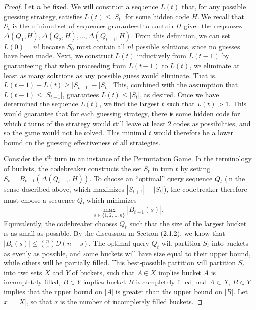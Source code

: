 \documentclass[12pt, a4paper]{article}
\newcommand{\nth}{^{\text{th}}}       %
\begin{document}
	\begin{proof}
		 Let $n$ be fixed. We will construct a sequence $L(t)$ that, for any possible guessing strategy, satisfies $L(t) \leq |S_t|$ for some hidden code $H$. We recall that $S_t$ is the minimal set of sequences guaranteed to contain $H$ given the responses $\Delta(Q_1, H), \Delta(Q_2, H), \ldots, \Delta(Q_{t-1}, H)$. From this definition, we can set $L(0) = n!$ because $S_0$ must contain all $n!$ possible solutions, since no guesses have been made. Next, we construct $L(t)$ inductively from $L(t-1)$ by guaranteeing that when proceeding from $L(t-1)$ to $L(t)$, we eliminate at least as many solutions as any possible guess would eliminate. That is, $L(t-1)-L(t) \geq |S_{t-1}| - |S_{t}|$. This, combined with the assumption that $L(t-1) \le |S_{t-1}|$, guarantees $L(t) \leq |S_t|$, as desired. Once we have determined the sequence $L(t)$, we find the largest $t$ such that $L(t) > 1$. This would guarantee that for each guessing strategy, there is some hidden code for which $t$ turns of the strategy would still leave at least 2 codes as possibilities, and so the game would not be solved. This minimal $t$ would therefore be a lower bound on the guessing effectiveness of all strategies. 
		 
		 Consider the $t\nth$ turn in an instance of the Permutation Game. In the terminology of buckets, the codebreaker constructs the set $S_t$ in turn $t$ by setting $S_t = B_{t-1}(\Delta(Q_{t-1}, H))$. To choose an ``optimal'' query sequence $Q_t$ (in the sense described above, which maximizes $|S_{t+1}| - |S_{t}|$), the codebreaker therefore must choose a sequence $Q_t$ which minimizes
		 \begin{equation*}
			\max_{s\in\{1,2,\ldots,n\}}|B_{t+1}(s)|.
		 \end{equation*}
		 Equivalently, the codebreaker chooses $Q_t$ such that the size of the largest bucket is as small as possible. By the discussion in Section (2.1.2), we know that $|B_t(s)|\le\binom{n}{s}D(n-s)$. The optimal query $Q_t$ will partition $S_t$ into buckets as evenly as possible, and some buckets will have size equal to their upper bound, while others will be partially filled. This best-possible partition will partition $S_t$ into two sets $X$ and $Y$ of buckets, such that $A\in X$ implies bucket $A$ is incompletely filled, $B\in Y$ implies bucket $B$ is completely filled, and $A\in X$, $B\in Y$ implies that the upper bound on $|A|$ is greater than the upper bound on $|B|$. Let $x = |X|$, so that $x$ is the number of incompletely filled buckets.
		 

\end{proof}
\end{document}
